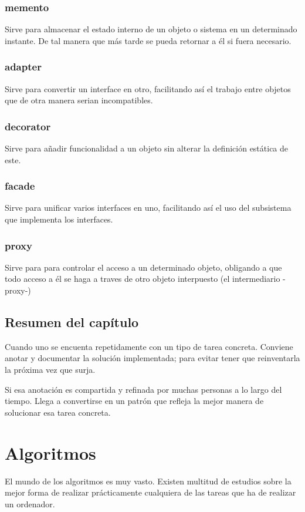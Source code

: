 \documentclass[spanish,12pt,a4paper,final,oneside]{book}
\begin{document}
\subsection{memento}
Sirve para almacenar el estado interno de un objeto o sistema en un determinado instante. De tal manera que más tarde se pueda retornar a él si fuera necesario.
\subsection{adapter}
Sirve para convertir un interface en otro, facilitando así el trabajo entre objetos que de otra manera serian incompatibles. 
\subsection{decorator}
Sirve para añadir funcionalidad a un objeto sin alterar la definición estática de este.
\subsection{facade}
Sirve para unificar varios interfaces en uno, facilitando así el uso del subsistema que implementa los interfaces.
\subsection{proxy}
Sirve para para controlar el acceso a un determinado objeto, obligando a que todo acceso a él se haga a traves de otro objeto interpuesto (el intermediario -proxy-)

\section*{Resumen del capítulo}
Cuando uno se encuenta repetidamente con un tipo de tarea concreta. Conviene anotar y documentar la solución implementada; para evitar tener que reinventarla la próxima vez que surja.

Si esa anotación es compartida y refinada por muchas personas a lo largo del tiempo. Llega a convertirse en un patrón que refleja la mejor manera de solucionar esa tarea concreta.




\chapter{Algoritmos}
El mundo de los algoritmos es muy vasto. Existen multitud de estudios sobre la mejor forma de realizar prácticamente cualquiera de las tareas que ha de realizar un ordenador.
\end{document}
